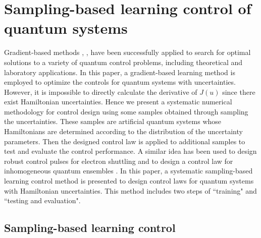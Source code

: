 \documentclass[letterpaper, 10 pt, conference]{ieeeconf}
\begin{document}
\section{Sampling-based learning control of quantum systems}\label{Sec3}
Gradient-based methods \cite{Brif et al 2010}, \cite{Long and Rabitz
2011}, \cite{Roslund and Rabitz 2009}
have been successfully applied to search for optimal solutions to a
variety of quantum control problems, including theoretical and
laboratory applications. In this paper, a gradient-based learning
method is employed to optimize the controls for quantum systems with uncertainties. However, it is impossible to directly calculate
the derivative of $J(u)$ since there exist Hamiltonian uncertainties. Hence
we present a systematic numerical methodology for control design
using some samples obtained through sampling the uncertainties.
These samples are artificial quantum systems whose Hamiltonians are determined
according to the distribution of the uncertainty parameters. Then the
designed control law is applied to additional samples to test and
evaluate the control performance. A similar idea has been used to design robust control pulses for electron shuttling \cite{Zhang et al 2012} and to design a control law for inhomogeneous quantum ensembles \cite{Chen et al 2013arXiv}. In this paper, a systematic sampling-based learning control method is
presented to design control laws for quantum systems with Hamiltonian uncertainties. This method includes two steps of
``training" and ``testing and evaluation".


\subsection{Sampling-based learning control}
\end{document}
